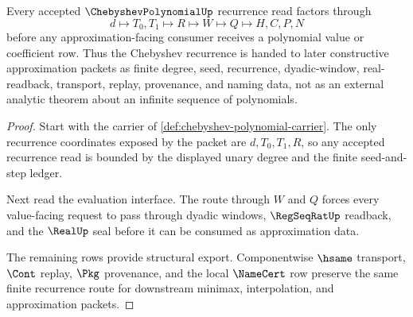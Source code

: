 \begin{theorem}\label{thm:chebyshev-polynomial-recurrence-handoff}
Every accepted $\ChebyshevPolynomialUp$ recurrence read factors through
$$
d\longmapsto T_0,T_1\longmapsto R\longmapsto W\longmapsto Q\longmapsto H,C,P,N
$$
before any approximation-facing consumer receives a polynomial value or coefficient row. Thus the Chebyshev recurrence is handed to later constructive approximation packets as finite degree, seed, recurrence, dyadic-window, real-readback, transport, replay, provenance, and naming data, not as an external analytic theorem about an infinite sequence of polynomials.
\end{theorem}
\begin{proof}
Start with the carrier of \autoref{def:chebyshev-polynomial-carrier}. The only recurrence coordinates exposed by the packet are $d,T_0,T_1,R$, so any accepted recurrence read is bounded by the displayed unary degree and the finite seed-and-step ledger.

Next read the evaluation interface. The route through $W$ and $Q$ forces every value-facing request to pass through dyadic windows, $\RegSeqRatUp$ readback, and the $\RealUp$ seal before it can be consumed as approximation data.

The remaining rows provide structural export. Componentwise $\hsame$ transport, $\Cont$ replay, $\Pkg$ provenance, and the local $\NameCert$ row preserve the same finite recurrence route for downstream minimax, interpolation, and approximation packets.
\end{proof}

\begin{closurestatus}{\ChebyshevPolynomialUp}
  \theoryclosure{\obligationClosure}
  \formalstatus{\unformalizedV}
\end{closurestatus}
